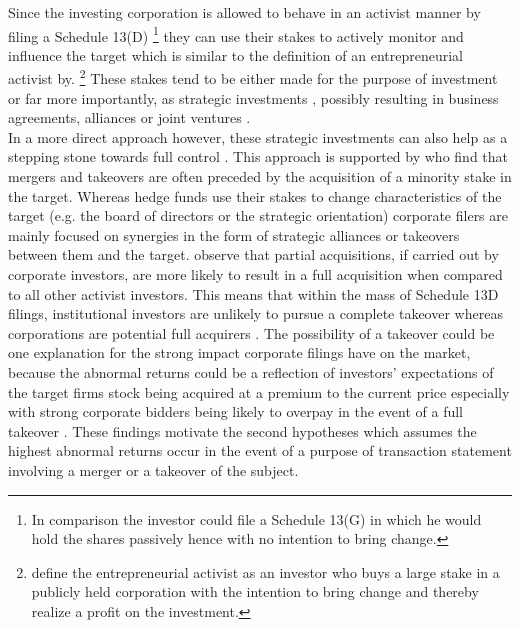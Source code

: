 \documentclass[12pt]{article}
\begin{document}
Since the investing corporation is allowed to behave in an activist manner by filing a Schedule 13(D) 
	\footnote{In comparison the investor could file a Schedule 13(G) in which he would hold the shares passively hence with no intention to bring change.} 
\citep{Brigida2012} they can use their stakes to actively monitor and influence the target which is similar to the definition of an entrepreneurial activist by. 
	\footnote{\citet{Klein2009} define the entrepreneurial activist as an investor who buys a large stake in a publicly held corporation with the intention to bring change and thereby realize a profit on the investment.} \citet{Klein2009}
These stakes tend to be either made for the purpose of investment or far more importantly, as strategic investments \citep{Damodaran2005}, possibly resulting in business agreements, alliances or joint ventures \citep{Allen2000}. \\
In a more direct approach however, these strategic investments can also help as a stepping stone towards full control \citep{Huang2017}. 
This approach is supported by \citet{Goldman2005} who find that mergers and takeovers are often preceded by the acquisition of a minority stake in the target. Whereas hedge funds use their stakes to change characteristics of the target (e.g. the board of directors or the strategic orientation) \citep{Klein2009} corporate filers are mainly focused on synergies in the form of strategic alliances or takeovers between them and the target. \citet{Akhigbe2007} observe that partial acquisitions, if carried out by corporate investors, are more likely to result in a full acquisition when compared to all other activist investors. This means that within the mass of Schedule 13D filings, institutional investors are unlikely to pursue a complete takeover whereas corporations are potential full acquirers \citep{Brigida2012}. The possibility of a takeover could be one explanation for the strong impact corporate filings have on the market, because the abnormal returns could be a reflection of investors' expectations of the target firms stock being acquired at a premium to the current price \citep{Goldman2005} especially with strong corporate bidders being likely to overpay in the event of a full takeover \citep{Akhigbe2007}.
These findings motivate the second hypotheses which assumes the highest abnormal returns occur in the event of a purpose of transaction statement involving a merger or a takeover of the subject.
\end{document}
